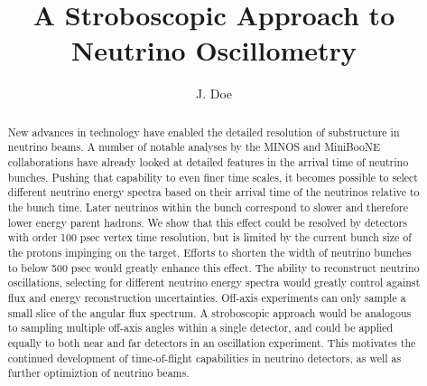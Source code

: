 \documentclass[preprint,12pt]{elsarticle}
\begin{document}
\begin{frontmatter}


\title{A Stroboscopic Approach to Neutrino Oscillometry}




\author{J. Doe}

\address{University of Amazements; Anywhere, USA}

\begin{abstract}
New advances in technology have enabled the detailed resolution of substructure in neutrino beams. A number of notable analyses by the MINOS and MiniBooNE collaborations have already looked at detailed features in the arrival time of neutrino bunches. Pushing that capability to even finer time scales, it becomes possible to select different neutrino energy spectra based on their arrival time of the neutrinos relative to the bunch time. Later neutrinos within the bunch correspond to slower and therefore lower energy parent hadrons. We show that this effect could be resolved by detectors with order 100 psec vertex time resolution, but is limited by the current bunch size of the protons impinging on the target. Efforts to shorten the width of neutrino bunches to below 500 psec would greatly enhance this effect. The ability to reconstruct neutrino oscillations, selecting for different neutrino energy spectra would greatly control against flux and energy reconstruction uncertainties. Off-axis experiments can only sample a small slice of the angular flux spectrum. A stroboscopic approach would be analogous to sampling multiple off-axis angles within a single detector, and could be applied equally to both near and far detectors in an oscillation experiment. This motivates the continued development of time-of-flight capabilities in neutrino detectors, as well as further optimiztion of neutrino beams. 



\end{abstract}
\end{frontmatter}
\end{document}
